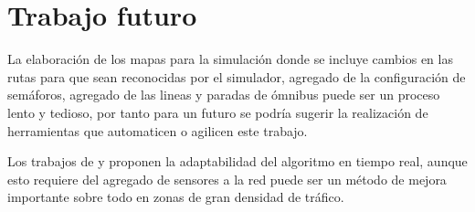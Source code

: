 \section{Trabajo futuro}

La elaboración de los mapas para la simulación donde se incluye cambios en las rutas para que sean reconocidas por el simulador, agregado de la configuración de semáforos, agregado de las lineas y paradas de ómnibus puede ser un proceso lento y tedioso, por tanto para un futuro se podría sugerir la realización de herramientas que automaticen o agilicen este trabajo.

Los trabajos de  \citet{Montana1996} y \citet{Vogel2000}  proponen la adaptabilidad del algoritmo en tiempo real, aunque esto requiere del agregado de sensores a la red puede ser un método de mejora importante sobre todo en zonas de gran densidad de tráfico.
